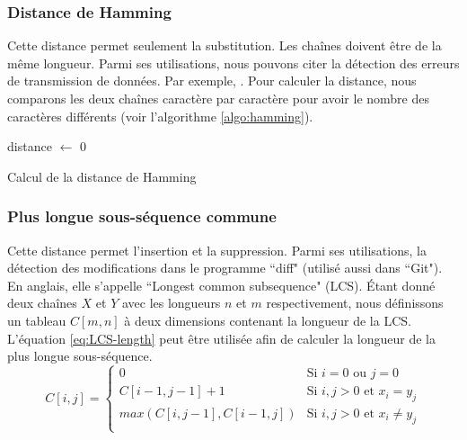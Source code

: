 \documentclass{KodeBook}
\begin{document}
\subsubsection{Distance de Hamming}

Cette distance permet seulement la substitution.
Les chaînes doivent être de la même longueur.
Parmi ses utilisations, nous pouvons citer la détection des erreurs de transmission de données.\newline
Par exemple, .
Pour calculer la distance, nous comparons les deux chaînes caractère par caractère pour avoir le nombre des caractères différents (voir l'algorithme \ref{algo:hamming}).

\begin{algorithm}[ht]
	distance $\leftarrow$ 0\;
	

	\caption{Calcul de la distance de Hamming \label{algo:hamming}}
	
\end{algorithm}


\subsubsection{Plus longue sous-séquence commune}

Cette distance permet l'insertion et la suppression.
Parmi ses utilisations, la détection des modifications dans le programme ``diff" (utilisé aussi dans ``Git").
En anglais, elle s'appelle ``Longest common subsequence" (LCS).
Étant donné deux chaînes $X$ et $Y$ avec les longueurs $n$ et $m$ respectivement, nous définissons un tableau $C[m, n]$ à deux dimensions contenant la longueur de la LCS.
L'équation \ref{eq:LCS-length} peut être utilisée afin de calculer la longueur de la plus longue sous-séquence. 
\begin{equation}
	C[i, j] =  
	\begin{cases}
		0 & \text{Si } i = 0 \text{ ou } j=0\\
		C[i-1, j-1] + 1 & \text{Si } i,j > 0 \text{ et } x_i = y_j\\
		max (C[i, j-1], C[i-1, j]) & \text{Si } i,j > 0 \text{ et } x_i \ne y_j\\
	\end{cases}
	\label{eq:LCS-length}
\end{equation}
\end{document}

